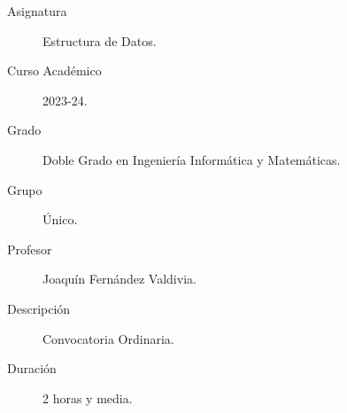 \documentclass[12pt]{article}
\begin{document}

    
    

    \begin{description}
        \item[Asignatura] Estructura de Datos.
        \item[Curso Académico] 2023-24.
        \item[Grado] Doble Grado en Ingeniería Informática y Matemáticas.
        \item[Grupo] Único.
        \item[Profesor] Joaquín Fernández Valdivia.
        \item[Descripción] Convocatoria Ordinaria.
        \item[Duración] 2 horas y media.
    
    \end{description}
    \newpage
    
\end{document}
